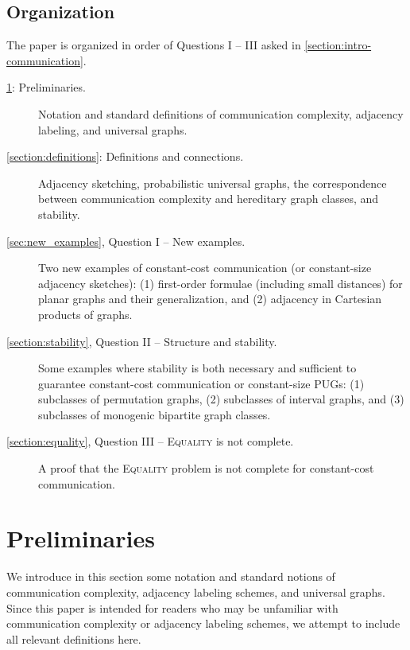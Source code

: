 \documentclass{article}
\begin{document}
\subsection{Organization}
\noindent
The paper is organized in order of Questions I -- III asked in \cref{section:intro-communication}.
\begin{description}
\item[\cref{section:preliminaries}: Preliminaries.] Notation and standard definitions of
communication complexity, adjacency labeling, and universal graphs.
\item[\cref{section:definitions}: Definitions and connections.] Adjacency sketching, probabilistic universal
graphs, the correspondence between communication complexity and hereditary graph classes, and
stability.
\item[\cref{sec:new_examples}, Question I -- New examples.] Two new examples of constant-cost communication (or
constant-size adjacency sketches): (1) first-order formulae (including small distances) for planar
graphs and their generalization, and (2) adjacency in Cartesian products of graphs.
\item[\cref{section:stability}, Question II -- Structure and stability.] Some examples where stability is both necessary and
sufficient to guarantee constant-cost communication or constant-size PUGs: (1) subclasses of
permutation graphs, (2) subclasses of interval graphs, and (3) subclasses of monogenic bipartite
graph classes.
\item[\cref{section:equality}, Question III -- \textsc{Equality} is not complete.] A proof that the
\textsc{Equality} problem is not complete for constant-cost communication.
\end{description}














\section{Preliminaries}
\label{section:preliminaries}

We introduce in this section some notation and standard notions of communication complexity,
adjacency labeling schemes, and universal graphs. Since this paper is intended for readers who may
be unfamiliar with communication complexity or adjacency labeling schemes, we attempt to include all
relevant definitions here.
\end{document}
